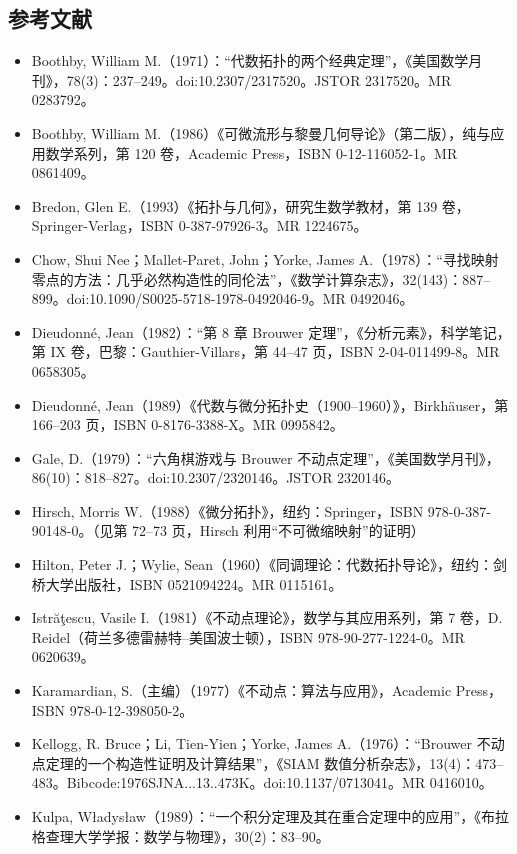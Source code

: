 \subsection{参考文献}
\begin{itemize}
\item Boothby, William M.（1971）：“代数拓扑的两个经典定理”，《美国数学月刊》，78(3)：237–249。doi:10.2307/2317520。JSTOR 2317520。MR 0283792。
\item Boothby, William M.（1986）《可微流形与黎曼几何导论》（第二版），纯与应用数学系列，第 120 卷，Academic Press，ISBN 0-12-116052-1。MR 0861409。
\item Bredon, Glen E.（1993）《拓扑与几何》，研究生数学教材，第 139 卷，Springer-Verlag，ISBN 0-387-97926-3。MR 1224675。
\item Chow, Shui Nee；Mallet-Paret, John；Yorke, James A.（1978）：“寻找映射零点的方法：几乎必然构造性的同伦法”，《数学计算杂志》，32(143)：887–899。doi:10.1090/S0025-5718-1978-0492046-9。MR 0492046。
\item Dieudonné, Jean（1982）：“第 8 章 Brouwer 定理”，《分析元素》，科学笔记，第 IX 卷，巴黎：Gauthier-Villars，第 44–47 页，ISBN 2-04-011499-8。MR 0658305。
\item Dieudonné, Jean（1989）《代数与微分拓扑史（1900–1960）》，Birkhäuser，第 166–203 页，ISBN 0-8176-3388-X。MR 0995842。
\item Gale, D.（1979）：“六角棋游戏与 Brouwer 不动点定理”，《美国数学月刊》，86(10)：818–827。doi:10.2307/2320146。JSTOR 2320146。
\item Hirsch, Morris W.（1988）《微分拓扑》，纽约：Springer，ISBN 978-0-387-90148-0。（见第 72–73 页，Hirsch 利用“不可微缩映射”的证明）
\item Hilton, Peter J.；Wylie, Sean（1960）《同调理论：代数拓扑导论》，纽约：剑桥大学出版社，ISBN 0521094224。MR 0115161。
\item Istrăţescu, Vasile I.（1981）《不动点理论》，数学与其应用系列，第 7 卷，D. Reidel（荷兰多德雷赫特–美国波士顿），ISBN 978-90-277-1224-0。MR 0620639。
\item Karamardian, S.（主编）（1977）《不动点：算法与应用》，Academic Press，ISBN 978-0-12-398050-2。
\item Kellogg, R. Bruce；Li, Tien-Yien；Yorke, James A.（1976）：“Brouwer 不动点定理的一个构造性证明及计算结果”，《SIAM 数值分析杂志》，13(4)：473–483。Bibcode:1976SJNA...13..473K。doi:10.1137/0713041。MR 0416010。
\item Kulpa, Władysław（1989）：“一个积分定理及其在重合定理中的应用”，《布拉格查理大学学报：数学与物理》，30(2)：83–90。

\end{itemize}
